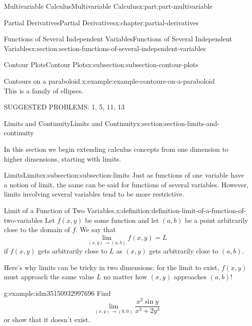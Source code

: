 \documentclass[twoside,10pt,]{book}
\numberwithin{equation}{part}
\begin{document}
\begin{partptx}{Multivariable Calculus}{}{Multivariable Calculus}{}{}{x:part:part-multivariable}
\begin{chapterptx}{Partial Derivatives}{}{Partial Derivatives}{}{}{x:chapter:partial-derivatives}
\begin{sectionptx}{Functions of Several Independent Variables}{}{Functions of Several Independent Variables}{}{}{x:section:section-functions-of-several-independent-variables}
\begin{subsectionptx}{Contour Plots}{}{Contour Plots}{}{}{x:subsection:subsection-contour-plots}
\begin{example}{Contours on a paraboloid.}{x:example:example-contours-on-a-paraboloid}
\begin{equation*}
\end{equation*}
This is a family of ellipses.%
\end{example}
\end{subsectionptx}
\begin{conclusion}{}%
SUGGESTED PROBLEMS: 1, 5, 11, 13%
\end{conclusion}%
\end{sectionptx}
%
%
\typeout{************************************************}
\typeout{************************************************}
%
\begin{sectionptx}{Limits and Continuity}{}{Limits and Continuity}{}{}{x:section:section-limits-and-continuity}
\begin{introduction}{}%
In this section we begin extending calculus concepts from one dimension to higher dimensions, starting with limits.%
\end{introduction}%
%
%
\typeout{************************************************}
\typeout{************************************************}
%
\begin{subsectionptx}{Limits}{}{Limits}{}{}{x:subsection:subsection-limits}
Just as functions of one variable have a notion of limit, the same can be said for functions of several variables. However, limits involving several variables tend to be more restrictive.%
\begin{definition}{Limit of a Function of Two Variables.}{x:definition:definition-limit-of-a-function-of-two-variables}%
%
Let \(f(x,y)\) be some function and let \((a,b)\) be a point arbitrarily close to the domain of \(f\). We say that%
\begin{equation*}
\lim_{(x,y)\to(a,b)}f(x,y) = L
\end{equation*}
if \(f(x,y)\) gets arbitrarily close to \(L\) as \((x,y)\) gets arbitrarily close to \((a,b)\).%
\end{definition}
Here's why limits can be tricky in two dimensions: for the limit to exist, \(f(x,y)\) must approach the same value \(L\) no matter how \((x,y)\) approaches \((a,b)\)!%
\begin{example}{}{g:example:idm35150932997696}%
Find%
\begin{equation*}
\lim_{(x,y)\to(0,0)}\frac{x^{2}\sin y}{x^{3}+2y^{3}}
\end{equation*}
or show that it doesn't exist.%
\par\smallskip%

\end{example}
\end{subsectionptx}
\end{sectionptx}
\end{chapterptx}
\end{partptx}
\end{document}
